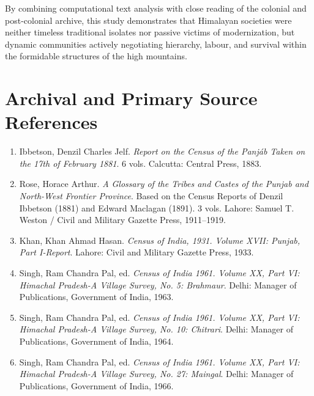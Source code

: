 \documentclass[11pt,a4paper]{article}
\begin{document}
By combining computational text analysis with close reading of the colonial and post-colonial archive, this study demonstrates that Himalayan societies were neither timeless traditional isolates nor passive victims of modernization, but dynamic communities actively negotiating hierarchy, labour, and survival within the formidable structures of the high mountains.

\section*{Archival and Primary Source References}
\begin{enumerate}[leftmargin=*]
    \item Ibbetson, Denzil Charles Jelf. \textit{Report on the Census of the Panj\'ab Taken on the 17th of February 1881}. 6 vols. Calcutta: Central Press, 1883.
    \item Rose, Horace Arthur. \textit{A Glossary of the Tribes and Castes of the Punjab and North-West Frontier Province}. Based on the Census Reports of Denzil Ibbetson (1881) and Edward Maclagan (1891). 3 vols. Lahore: Samuel T. Weston / Civil and Military Gazette Press, 1911--1919.
    \item Khan, Khan Ahmad Hasan. \textit{Census of India, 1931. Volume XVII: Punjab, Part I-Report}. Lahore: Civil and Military Gazette Press, 1933.
    \item Singh, Ram Chandra Pal, ed. \textit{Census of India 1961. Volume XX, Part VI: Himachal Pradesh-A Village Survey, No. 5: Brahmaur}. Delhi: Manager of Publications, Government of India, 1963.
    \item Singh, Ram Chandra Pal, ed. \textit{Census of India 1961. Volume XX, Part VI: Himachal Pradesh-A Village Survey, No. 10: Chitrari}. Delhi: Manager of Publications, Government of India, 1964.
    \item Singh, Ram Chandra Pal, ed. \textit{Census of India 1961. Volume XX, Part VI: Himachal Pradesh-A Village Survey, No. 27: Maingal}. Delhi: Manager of Publications, Government of India, 1966.
\end{enumerate}
\end{document}
